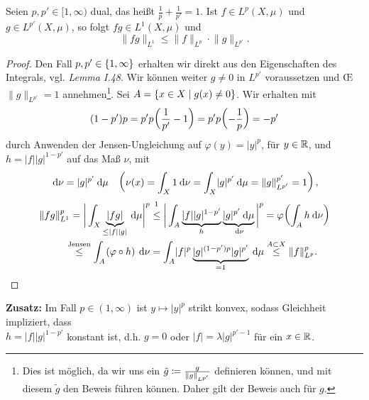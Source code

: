 \documentclass[skript.tex]{subfiles}
\begin{document}
	
\setcounter{cntr}{5}

\begin{theorem}[Hölder]
	Seien $p, p' \in [1, \infty)$ \textup{dual}, das heißt $\frac{1}{p} + \frac{1}{p'} = 1$. Ist $f \in L^p (X, \mu)$ und \\ $g \in L^{p'} (X,\mu)$, so folgt $fg \in L^1(X,\mu)$ und 
	\[
		\lVert fg \rVert_{L^1} \leq \lVert f \rVert_{L^p} \cdot \lVert g \rVert_{L^{p'}}.
	\]
\end{theorem}

\begin{proof}
	Den Fall $p,p' \in \left\{1,\infty\right\}$ erhalten wir direkt aus den Eigenschaften des Integrals, vgl. \textit{Lemma I.48}. Wir können weiter $g\neq 0$ in $L^{p'}$ voraussetzen und \OE\ $\lVert g \rVert_{L^{p'}} = 1$ annehmen\footnote{Dies ist möglich, da wir uns ein $\tilde{g} \coloneqq \frac{g}{\lVert g \rVert_{L^{p'} } }$ definieren können, und mit diesem $\tilde{g}$ den Beweis führen können. Daher gilt der Beweis auch für $g$.}. Sei $A = \left\{x\in X \mid g(x) \neq 0\right\}$. Wir erhalten mit 
	\[
		(1-p')p = p'p\pr{\frac{1}{p'} -1} = p'p\pr{-\frac{1}{p}} = -p'
	\]
	durch Anwenden der Jensen-Ungleichung auf $\varphi(y) = \lvert y \rvert^p$, für $y \in \mathbb{R}$, und $h=\lvert f \rvert \lvert g \rvert^{1-p'}$ auf das Maß $\nu$, mit 
	\[
		\md \nu = \lvert g \rvert^{p'} \md \mu \quad \pr{\nu(x) = \int_X 1 \md \nu = \int_X \lvert g \rvert^{p'} \md \mu = \lVert g \rVert_{L^{p'}}^{p'} = 1},
	\]
	\begin{align*}
		\lVert fg \rVert_{L^1}^{p} &= \bigg\lvert \int_X \underbrace{\lvert fg \rvert }_{\leq \lvert f \rvert \lvert g \rvert} \md \mu \bigg\rvert^p \stackrel{\footnotemark}{\leq} \bigg\lvert \int_A \underbrace{\lvert f \rvert \lvert g \rvert^{1-p'}}_{h} \underbrace{\lvert g \rvert^{p'} \md \mu}_{\md \nu} \bigg\rvert^p = \varphi \pr{\int_A h \md \nu}\\
		&\kern -0.5em \stackrel{\text{\scriptsize Jensen}}{\leq} \int_A \pr{\varphi \circ h} \md \nu = \int_A \lvert f \rvert^p \underbrace{\lvert g \rvert^{(1-p')p} \lvert g \rvert^{p'}}_{=1} \md \mu \stackrel{A\sbs X}{\leq} \lVert f \rVert_{L^p}^p.
	\end{align*}
\end{proof}

\textbf{Zusatz:} Im Fall $p \in (1, \infty)$ ist $y \mapsto \lvert y \rvert^p$ strikt konvex, sodass Gleichheit impliziert, dass \\$h = \lvert f \rvert \lvert g \rvert^{1-p'}$ konstant ist, d.h. $g=0$ oder $\lvert f \rvert = \lambda \lvert g \rvert^{p'-1}$ für ein $x \in \mathbb{R}$. %
\end{document}
